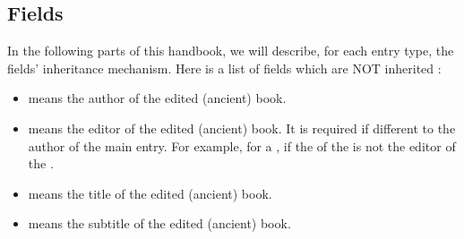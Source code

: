 \documentclass{ltxdockit}[2011/03/25]
\begin{document}
\subsection{Fields}

In the following parts of this handbook, we will describe, for each entry type, the fields' inheritance mechanism. Here is a list of fields which are NOT inherited :
\begin{itemize}
  \item {} means the author of the edited (ancient) book.
  \item {} means the editor of the edited (ancient) book.
    It is required if different to the author of the main entry. For example, for a , if the  of the  is not the editor of the .
  \item {} means the title of the edited (ancient) book.
  \item {} means the subtitle of the edited (ancient) book.
 
\end{itemize}


\def\firstofthree#1#2#3{#1}
\def\secondofthree#1#2#3{#2}
\def\thirdofthree#1#2#3{#3}
\renewcommand{\do}[1]{%
  \edef\entrytype{\firstofthree#1}%
  \edef\entrykey{\secondofthree#1}%
  \edef\entrymore{\thirdofthree#1}%
  \subsection{\bibtype{bookin\entrytype}}
  \subsubsection{Meaning}
  For book edited in a \bibtype{\entrytype} entry.
  \subsubsection{.bib example}
  
  \inputminted[breaklines]{latex}{example-bookin\entrytype.bib}
  
  \subsubsection{Fields inheritance}
  The graph~\ref{example-bookin\entrytype} shows the fields inheritance.
  \begin{figure}
    \texttt{[image: example-bookin\\entrytype.pdf]}
    \label{example-bookin\entrytype}
    \caption{Inheritance related to the \bibtype{bookin\entrytype} entry type}
  \end{figure} 
  \subsubsection{Output example}
  \begin{quotation}
    \cite{\entrykey}
  \end{quotation}
  \entrymore 
}
\end{document}
